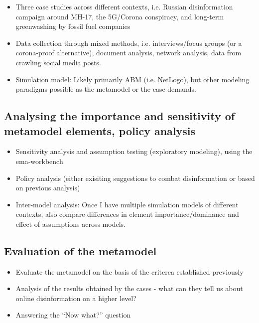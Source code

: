 \begin{itemize}
	\item Three case studies across different contexts, i.e. Russian disinformation campaign around MH-17, the 5G/Corona conspiracy, and long-term greenwashing by fossil fuel companies
	\item Data collection through mixed methods, i.e. interviews/focus groups (or a corona-proof alternative), document analysis, network analysis, data from crawling social media posts.
	\item Simulation model: Likely primarily ABM (i.e. NetLogo), but other modeling paradigms possible as the metamodel or the case demands.
\end{itemize}

\subsection{Analysing the importance and sensitivity of metamodel elements, policy analysis}
\begin{itemize}
	\item Sensitivity analysis and assumption testing (exploratory modeling), using the ema-workbench
	\item Policy analysis (either exisiting suggestions to combat disinformation or based on previous analysis)
	\item Inter-model analysis: Once I have multiple simulation models of different contexts, also compare differences in element importance/dominance and effect of assumptions across models.
\end{itemize}

\subsection{Evaluation of the metamodel}
\begin{itemize}
	\item Evaluate the metamodel on the basis of the criterea established previously
	\item Analysis of the results obtained by the cases - what can they tell us about online disinformation on a higher level?
	\item Answering the ``Now what?'' question
\end{itemize}